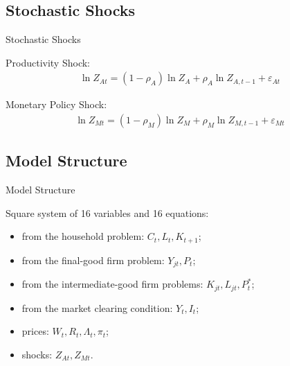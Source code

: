 \documentclass[
presentation.tex
]{subfiles}
\begin{document}

\subsection{Stochastic Shocks}

\begin{frame}{Stochastic Shocks}
	
	Productivity Shock:
	\begin{align}
		\ln{Z_{At}} = (1-\rho_A)\ln{Z_A} + \rho_A\ln{Z_{A,t-1}} + \varepsilon_{At} \label{eq:productivity-shock}
	\end{align}
	
	Monetary Policy Shock:
	\begin{align}
		\ln{Z_{Mt}} = (1-\rho_M)\ln{Z_{M}} + \rho_M\ln{Z_{M,t-1}} + \varepsilon_{Mt} \label{eq:monetary-shock}
	\end{align}
	
	
\end{frame}


\subsection{Model Structure}

\begin{frame}[allowframebreaks]{Model Structure}
	
	{\singlespacing

Square system of 16 variables and 16 equations:

\begin{itemize}
	\item from the household problem: $C_t, L_t, K_{t+1}$;
	\item from the final-good firm problem: $Y_{jt}, P_t$;
	\item from the intermediate-good firm problems: $K_{jt}, L_{jt}, P_t^\ast$;
	\item from the market clearing condition: $Y_t, I_t$;
	\item prices: $W_t, R_t, \Lambda_t, \pi_t$;
	\item shocks: $Z_{At}, Z_{Mt}$.
\end{itemize}

	} %

\end{frame}
\end{document}
